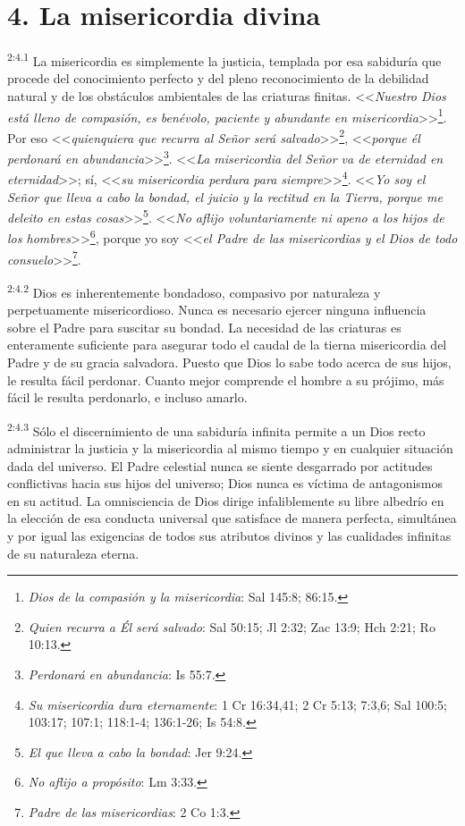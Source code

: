 \section*{4. La misericordia divina}
\par
\textsuperscript{2:4.1} La misericordia es simplemente la justicia, templada por esa sabiduría que procede del conocimiento perfecto y del pleno reconocimiento de la debilidad natural y de los obstáculos ambientales de las criaturas finitas. <<\textit{Nuestro Dios está lleno de compasión, es benévolo, paciente y abundante en misericordia}>>\footnote{\textit{Dios de la compasión y la misericordia}: Sal 145:8; 86:15.}. Por eso <<\textit{quienquiera que recurra al Señor será salvado}>>\footnote{\textit{Quien recurra a Él será salvado}: Sal 50:15; Jl 2:32; Zac 13:9; Hch 2:21; Ro 10:13.}, <<\textit{porque él perdonará en abundancia}>>\footnote{\textit{Perdonará en abundancia}: Is 55:7.}. <<\textit{La misericordia del Señor va de eternidad en eternidad}>>; sí, <<\textit{su misericordia perdura para siempre}>>\footnote{\textit{Su misericordia dura eternamente}: 1 Cr 16:34,41; 2 Cr 5:13; 7:3,6; Sal 100:5; 103:17; 107:1; 118:1-4; 136:1-26; Is 54:8.}. <<\textit{Yo soy el Señor que lleva a cabo la bondad, el juicio y la rectitud en la Tierra, porque me deleito en estas cosas}>>\footnote{\textit{El que lleva a cabo la bondad}: Jer 9:24.}. <<\textit{No aflijo voluntariamente ni apeno a los hijos de los hombres}>>\footnote{\textit{No aflijo a propósito}: Lm 3:33.}, porque yo soy <<\textit{el Padre de las misericordias y el Dios de todo consuelo}>>\footnote{\textit{Padre de las misericordias}: 2 Co 1:3.}.

\par
\textsuperscript{2:4.2} Dios es inherentemente bondadoso, compasivo por naturaleza y perpetuamente misericordioso. Nunca es necesario ejercer ninguna influencia sobre el Padre para suscitar su bondad. La necesidad de las criaturas es enteramente suficiente para asegurar todo el caudal de la tierna misericordia del Padre y de su gracia salvadora. Puesto que Dios lo sabe todo acerca de sus hijos, le resulta fácil perdonar. Cuanto mejor comprende el hombre a su prójimo, más fácil le resulta perdonarlo, e incluso amarlo.

\par
\textsuperscript{2:4.3} Sólo el discernimiento de una sabiduría infinita permite a un Dios recto administrar la justicia y la misericordia al mismo tiempo y en cualquier situación dada del universo. El Padre celestial nunca se siente desgarrado por actitudes conflictivas hacia sus hijos del universo; Dios nunca es víctima de antagonismos en su actitud. La omnisciencia de Dios dirige infaliblemente su libre albedrío en la elección de esa conducta universal que satisface de manera perfecta, simultánea y por igual las exigencias de todos sus atributos divinos y las cualidades infinitas de su naturaleza eterna.

